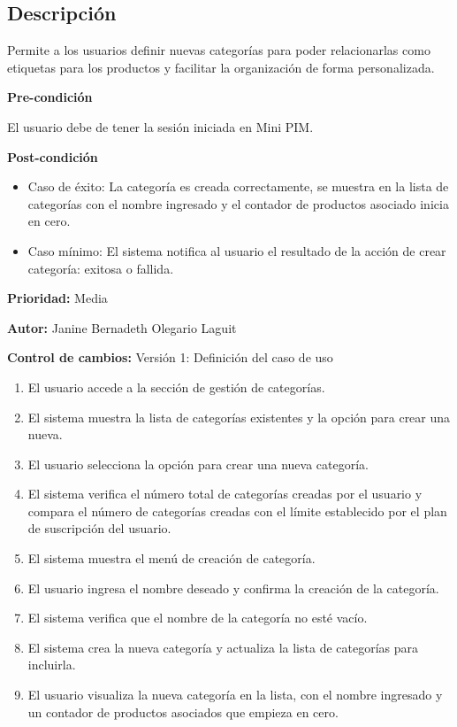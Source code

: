 
\subsection*{Descripción}
Permite a los usuarios definir nuevas categorías para poder relacionarlas como etiquetas para los productos y facilitar la organización de forma personalizada.\par
\vspace{0.15cm}

\textbf{Pre-condición}\par
El usuario debe de tener la sesión iniciada en Mini PIM.\par
\vspace{0.15cm}

\textbf{Post-condición}
\begin{itemize}
    \item Caso de éxito: La categoría es creada correctamente, se muestra en la lista de categorías con el nombre ingresado y el contador de productos asociado inicia en cero.
    \item Caso mínimo: El sistema notifica al usuario el resultado de la acción de crear categoría: exitosa o fallida.
\end{itemize}

\textbf{Prioridad: }
Media
\vspace{0.15cm}

\textbf{Autor: }
Janine Bernadeth Olegario Laguit\par
\vspace{0.15cm}

\textbf{Control de cambios: } Versión 1: Definición del caso de uso

\begin{enumerate}
    \item El usuario accede a la sección de gestión de categorías.
    \item El sistema muestra la lista de categorías existentes y la opción para crear una nueva.
    \item El usuario selecciona la opción para crear una nueva categoría.
    \item El sistema verifica el número total de categorías creadas por el usuario y compara el número de categorías creadas con el límite establecido por el plan de suscripción del usuario.
    \item El sistema muestra el menú de creación de categoría.
    \item El usuario ingresa el nombre deseado y confirma la creación de la categoría.
    \item El sistema verifica que el nombre de la categoría no esté vacío.
    \item El sistema crea la nueva categoría y actualiza la lista de categorías para incluirla.
    \item El usuario visualiza la nueva categoría en la lista, con el nombre ingresado y un contador de productos asociados que empieza en cero.
\end{enumerate}

